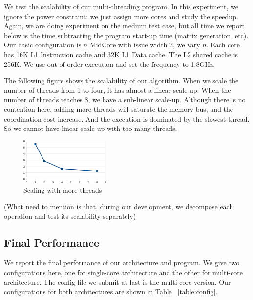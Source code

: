 \documentclass[twocolumn,letterpaper,10pt]{article}
\begin{document}
We test the scalability of our multi-threading program. In this
experiment, we ignore the power constraint: we just assign more cores
and study the speedup. Again, we are doing experiment on the medium
test case, but all time we report below is the time subtracting the
program start-up time (matrix generation, etc). Our basic
configuration is $n$ MidCore with issue width 2, we vary $n$. Each core
has 16K L1 Instruction cache and 32K L1 Data cache. The L2 shared
cache is 256K. We use out-of-order execution and set the frequency to 1.8GHz.

The following figure shows the scalability of our algorithm. When we
scale the number of threads from 1 to four, it has almost a linear
scale-up. When the number of threads reaches 8, we have a sub-linear
scale-up. Although there is no contention here, adding more threads will
saturate the memory bus, and the coordination cost increase. And the
execution is dominated by the slowest thread. So we cannot have linear
scale-up with too many threads.

\begin{figure}[ht!]
\centering
\includegraphics[width=0.4\textwidth]{figures/scale2.eps}
\caption{Scaling with more threads}
\end{figure}

(What need to mention is that, during our development, we decompose
each operation and test its scalability separately)

\subsection{Final Performance}
We report the final performance of our architecture and program. We
give two configurations here, one for single-core architecture and the
other for multi-core architecture. The config file we submit at last
is the multi-core version. Our configurations for both architectures
are shown in Table ~\ref{table:config}.
\end{document}

